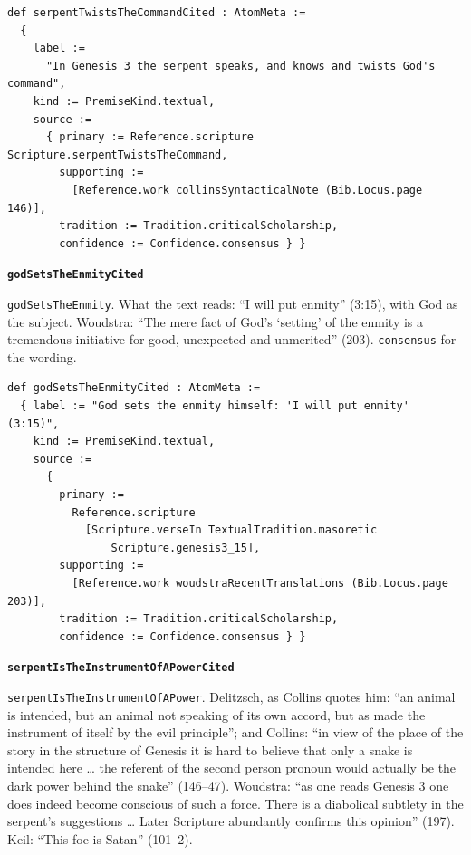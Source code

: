 \documentclass[11pt]{article}
\begin{document}
{\small\begin{verbatim}
def serpentTwistsTheCommandCited : AtomMeta :=
  {
    label :=
      "In Genesis 3 the serpent speaks, and knows and twists God's command",
    kind := PremiseKind.textual,
    source :=
      { primary := Reference.scripture Scripture.serpentTwistsTheCommand,
        supporting :=
          [Reference.work collinsSyntacticalNote (Bib.Locus.page 146)],
        tradition := Tradition.criticalScholarship,
        confidence := Confidence.consensus } }
\end{verbatim}}
\par\medskip\noindent\textbf{\texttt{god\allowbreak{}Sets\allowbreak{}The\allowbreak{}Enmity\allowbreak{}Cited}}\par\nobreak\noindent
\texttt{god\allowbreak{}Sets\allowbreak{}The\allowbreak{}Enmity}. What the text reads: “I will put enmity” (3:15), with God as the subject. Woudstra: “The mere fact of God’s ‘setting’ of the enmity is a tremendous initiative for good, unexpected and unmerited” (203). \texttt{consensus} for the wording.

{\small\begin{verbatim}
def godSetsTheEnmityCited : AtomMeta :=
  { label := "God sets the enmity himself: 'I will put enmity' (3:15)",
    kind := PremiseKind.textual,
    source :=
      {
        primary :=
          Reference.scripture
            [Scripture.verseIn TextualTradition.masoretic
                Scripture.genesis3_15],
        supporting :=
          [Reference.work woudstraRecentTranslations (Bib.Locus.page 203)],
        tradition := Tradition.criticalScholarship,
        confidence := Confidence.consensus } }
\end{verbatim}}
\par\medskip\noindent\textbf{\texttt{serpent\allowbreak{}Is\allowbreak{}The\allowbreak{}Instrument\allowbreak{}Of\allowbreak{}APower\allowbreak{}Cited}}\par\nobreak\noindent
\texttt{serpent\allowbreak{}Is\allowbreak{}The\allowbreak{}Instrument\allowbreak{}Of\allowbreak{}APower}. Delitzsch, as Collins quotes him: “an animal is intended, but an animal not speaking of its own accord, but as made the instrument of itself by the evil principle”; and Collins: “in view of the place of the story in the structure of Genesis it is hard to believe that only a snake is intended here … the referent of the second person pronoun would actually be the dark power behind the snake” (146–47). Woudstra: “as one reads Genesis 3 one does indeed become conscious of such a force. There is a diabolical subtlety in the serpent’s suggestions … Later Scripture abundantly confirms this opinion” (197). Keil: “This foe is Satan” (101–2).
\end{document}
